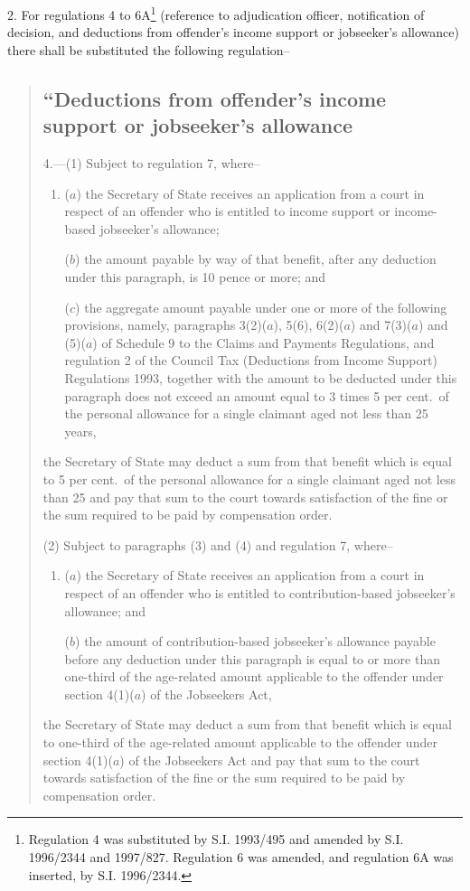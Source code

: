 \documentclass[12pt,a4paper]{article}
\begin{document}
2.  For regulations 4 to 6A\footnote{\frenchspacing Regulation 4 was substituted by S.I. 1993/495 and amended by S.I. 1996/2344 and 1997/827. Regulation 6 was amended, and regulation 6A was inserted, by S.I. 1996/2344.} (reference to adjudication officer, notification of decision, and deductions from offender’s income support or jobseeker’s allowance) there shall be substituted the following regulation–
\begin{quotation}
\subsection*{“Deductions from offender’s income support or jobseeker’s allowance}

4.---(1)  Subject to regulation 7, where–
\begin{enumerate}\item[]
($a$) the Secretary of State receives an application from a court in respect of an offender who is entitled to income support or income-based jobseeker’s allowance;

($b$) the amount payable by way of that benefit, after any deduction under this paragraph, is 10 pence or more; and

($c$) the aggregate amount payable under one or more of the following provisions, namely, paragraphs 3(2)($a$), 5(6), 6(2)($a$)  and 7(3)($a$)  and (5)($a$)  of Schedule 9 to the Claims and Payments Regulations, and regulation 2 of the Council Tax (Deductions from Income Support) Regulations 1993, together with the amount to be deducted under this paragraph does not exceed an amount equal to 3 times 5 per cent.\ of the personal allowance for a single claimant aged not less than 25 years,
\end{enumerate}
the Secretary of State may deduct a sum from that benefit which is equal to 5 per cent.\ of the personal allowance for a single claimant aged not less than 25 and pay that sum to the court towards satisfaction of the fine or the sum required to be paid by compensation order.

(2) Subject to paragraphs (3) and (4) and regulation 7, where–
\begin{enumerate}\item[]
($a$) the Secretary of State receives an application from a court in respect of an offender who is entitled to contribution-based jobseeker’s allowance; and

($b$) the amount of contribution-based jobseeker’s allowance payable before any deduction under this paragraph is equal to or more than one-third of the age-related amount applicable to the offender under section 4(1)($a$)  of the Jobseekers Act,
\end{enumerate}
the Secretary of State may deduct a sum from that benefit which is equal to one-third of the age-related amount applicable to the offender under section 4(1)($a$)  of the Jobseekers Act and pay that sum to the court towards satisfaction of the fine or the sum required to be paid by compensation order.


\end{quotation}
\end{document}
